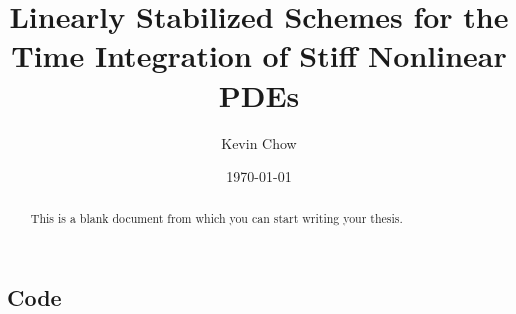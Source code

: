 \documentclass{sfuthesis}
\title{Linearly Stabilized Schemes for the Time Integration of Stiff Nonlinear PDEs}
\author{Kevin Chow}
\date{\today}
\theoremstyle{plain}
\theoremstyle{definition}
\theoremstyle{remark}
\begin{document}
\frontmatter
\maketitle{}
\makecommittee{}

\begin{abstract}
	This is a blank document from which you can start writing your thesis.
\end{abstract}


\begin{dedication} %
\end{dedication}


\begin{acknowledgements} %
\end{acknowledgements}

\tableofcontents\clearpage
{}\listoftables\clearpage
{}\listoffigures





%
%

\mainmatter%














%
%
%
%
%

\backmatter%
	

\begin{appendices} %
	\chapter{Code}
\end{appendices}
\end{document}
